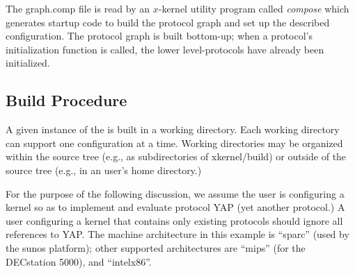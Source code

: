 The graph.comp file is read by an $x$-kernel utility program called
{\em compose} which generates startup code to build the protocol
graph and set up the described configuration.  The protocol graph is
built bottom-up; when a protocol's initialization function is called,
the lower level-protocols have already been initialized.

\subsection{Build Procedure}
\label{building}

A given instance of the \xk{} is built in a working directory.  Each
working directory can support one \xk{} configuration at a time.
Working directories may be organized within the \xk{} source tree
(e.g., as subdirectories of {\sanss xkernel/build}) or outside of
the source tree (e.g., in an \xk{} user's home directory.)  

For the purpose of the following discussion, we assume the user is
configuring a kernel so as to implement and evaluate protocol YAP 
(yet another protocol.) A
user configuring a kernel that contains only existing protocols should
ignore all references to YAP.  The machine architecture in this
example is ``sparc'' (used by the sunos platform); other supported 
architectures are ``mips'' (for the DECstation 5000), and ``intelx86''.

